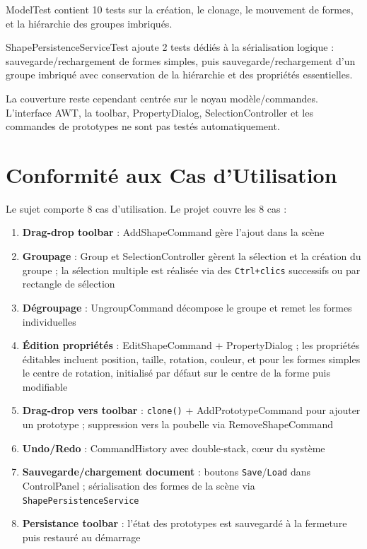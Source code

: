 \documentclass[11pt,a4paper,french]{article}
\begin{document}
ModelTest contient 10 tests sur la création, le clonage, le mouvement de formes, et la hiérarchie des groupes imbriqués.

ShapePersistenceServiceTest ajoute 2 tests dédiés à la sérialisation logique : sauvegarde/rechargement de formes simples, puis sauvegarde/rechargement d'un groupe imbriqué avec conservation de la hiérarchie et des propriétés essentielles.

La couverture reste cependant centrée sur le noyau modèle/commandes. L'interface AWT, la toolbar, PropertyDialog, SelectionController et les commandes de prototypes ne sont pas testés automatiquement.

\section{Conformité aux Cas d'Utilisation}

Le sujet comporte 8 cas d'utilisation. Le projet couvre les 8 cas :

\begin{enumerate}
  \item \textbf{Drag-drop toolbar} : AddShapeCommand gère l'ajout dans la scène
  \item \textbf{Groupage} : Group et SelectionController gèrent la sélection et la création du groupe ; la sélection multiple est réalisée via des \texttt{Ctrl+clics} successifs ou par rectangle de sélection
  \item \textbf{Dégroupage} : UngroupCommand décompose le groupe et remet les formes individuelles
  \item \textbf{Édition propriétés} : EditShapeCommand + PropertyDialog ; les propriétés éditables incluent position, taille, rotation, couleur, et pour les formes simples le centre de rotation, initialisé par défaut sur le centre de la forme puis modifiable
  \item \textbf{Drag-drop vers toolbar} : \texttt{clone()} + AddPrototypeCommand pour ajouter un prototype ; suppression vers la poubelle via RemoveShapeCommand
  \item \textbf{Undo/Redo} : CommandHistory avec double-stack, cœur du système
  \item \textbf{Sauvegarde/chargement document} : boutons \texttt{Save}/\texttt{Load} dans ControlPanel ; sérialisation des formes de la scène via \texttt{ShapePersistenceService}
  \item \textbf{Persistance toolbar} : l'état des prototypes est sauvegardé à la fermeture puis restauré au démarrage
\end{enumerate}
\end{document}

